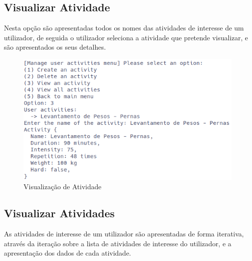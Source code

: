 \documentclass[a4paper,12pt]{scrreprt}
\begin{document}
    \clearpage
    \subsection{Visualizar Atividade}
    Nesta opção são apresentadas todos os nomes das atividades de interesse de um utilizador,
    de seguida o utilizador seleciona a atividade que pretende visualizar,
    e são apresentados os seus detalhes.

    \begin{figure}[!ht]
        \centering
        \includegraphics[width=\textwidth]{images/viewActivity.png}
        \caption{Visualização de Atividade}
        \label{fig:view-activity}
    \end{figure}

    \clearpage
    \subsection{Visualizar Atividades}
    As atividades de interesse de um utilizador são apresentadas de forma iterativa,
    através da iteração sobre a lista de atividades de interesse do utilizador,
    e a apresentação dos dados de cada atividade.
\end{document}
